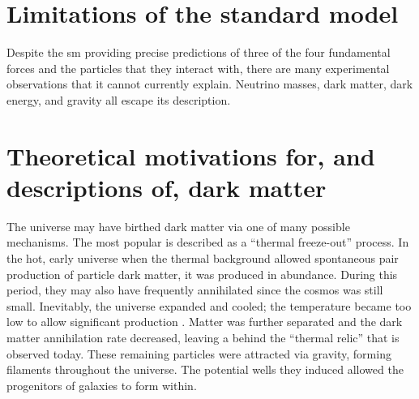 

\section{Limitations of the standard model}
\label{sec:sm_limitations}


Despite the \acrlong{sm} providing precise predictions of three of the four fundamental forces and the particles that they interact with, there are many experimental observations that it cannot currently explain. Neutrino masses, dark matter, dark energy, and gravity all escape its description.



\section{Theoretical motivations for, and descriptions of, dark matter}
\label{sec:theory_dark_matter}


The universe may have birthed dark matter via one of many possible mechanisms. The most popular is described as a ``thermal freeze-out'' process. In the hot, early universe when the thermal background allowed spontaneous pair production of particle dark matter, it was produced in abundance. During this period, they may also have frequently annihilated since the cosmos was still small. Inevitably, the universe expanded and cooled; the temperature became too low to allow significant production \cite{Baldes:2017gzw}. Matter was further separated and the dark matter annihilation rate decreased, leaving a behind the ``thermal relic'' that is observed today. These remaining particles were attracted via gravity, forming filaments throughout the universe. The potential wells they induced allowed the progenitors of galaxies to form within.


\iffalse

